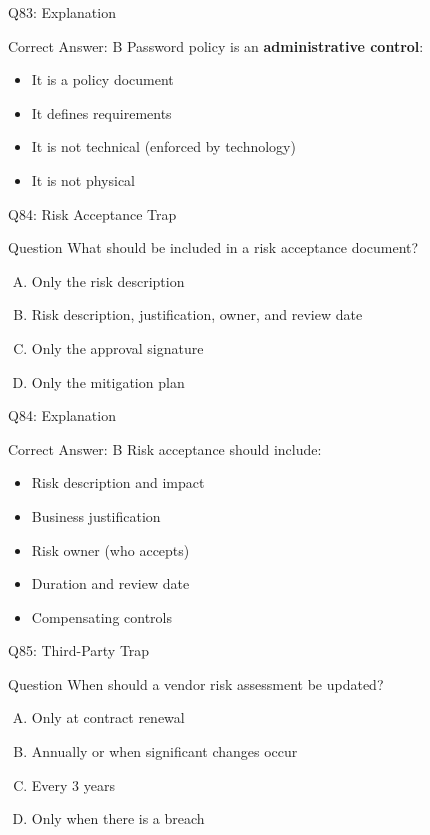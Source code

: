 \documentclass{beamer}
\begin{document}
	\begin{frame}{Q83: Explanation}
		\begin{block}{Correct Answer: B}
			Password policy is an \textbf{administrative control}:
			\begin{itemize}
				\item It is a policy document
				\item It defines requirements
				\item It is not technical (enforced by technology)
				\item It is not physical
			\end{itemize}
		\end{block}
	\end{frame}
	
	\begin{frame}{Q84: Risk Acceptance Trap}
		\begin{block}{Question}
			What should be included in a risk acceptance document?
		\end{block}
		\begin{enumerate}[(A)]
			\item Only the risk description
			\item Risk description, justification, owner, and review date
			\item Only the approval signature
			\item Only the mitigation plan
		\end{enumerate}
	\end{frame}
	
	\begin{frame}{Q84: Explanation}
		\begin{block}{Correct Answer: B}
			Risk acceptance should include:
			\begin{itemize}
				\item Risk description and impact
				\item Business justification
				\item Risk owner (who accepts)
				\item Duration and review date
				\item Compensating controls
			\end{itemize}
		\end{block}
	\end{frame}
	
	\begin{frame}{Q85: Third-Party Trap}
		\begin{block}{Question}
			When should a vendor risk assessment be updated?
		\end{block}
		\begin{enumerate}[(A)]
			\item Only at contract renewal
			\item Annually or when significant changes occur
			\item Every 3 years
			\item Only when there is a breach
		\end{enumerate}
	\end{frame}
	
\end{document}
